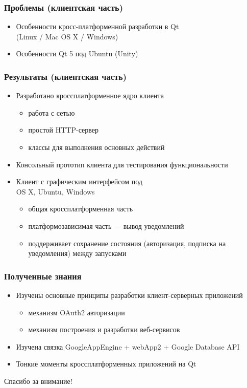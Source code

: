 \documentclass[10pt,pdf,hyperref={unicode}]{beamer}
\begin{document}
    \begin{frame}\frametitle{Проблемы (клиентская часть)}
        \begin{itemize}%
            \item Особенности кросс-платформенной разработки в Qt \\
            (Linux / Mac OS X / Windows)
            \item Особенности Qt 5 под Ubuntu (Unity)
        \end{itemize}
    \end{frame}
    
    \begin{frame}\frametitle{Результаты (клиентская часть)}
        \begin{itemize}%
            \item Разработано кроссплатформенное ядро клиента            	
            \begin{itemize}
                \item работа с сетью
                \item простой HTTP-сервер
                \item классы для выполнения основных действий
            \end{itemize}
            \item Консольный прототип клиента для тестирования функциональности
            \item Клиент с графическим интерфейсом под \\ OS X, Ubuntu, Windows
            \begin{itemize}
                \item общая кроссплатформенная часть
                \item платформозависимая часть --- вывод уведомлений
                \item поддерживает сохранение состояния (авторизация, подписка
                на уведомления) между запусками
            \end{itemize}
        \end{itemize}
    \end{frame}

    \begin{frame}\frametitle{Полученные знания}
        \begin{itemize}%
            \item	Изучены основные принципы разработки клиент-серверных приложений
            \begin{itemize}
                \item механизм OAuth2 авторизации
                \item механизм построения и разработки веб-сервисов
            \end{itemize}            
            \item	Изучена связка GoogleAppEngine + webApp2 + Google Database API
            \item	Тонкие моменты кроссплатформенных приложений на Qt
        \end{itemize}
    \end{frame}

    \begin{frame}
        \begin{center}
            Спасибо за внимание!
        \end{center}
    \end{frame}
\end{document}
